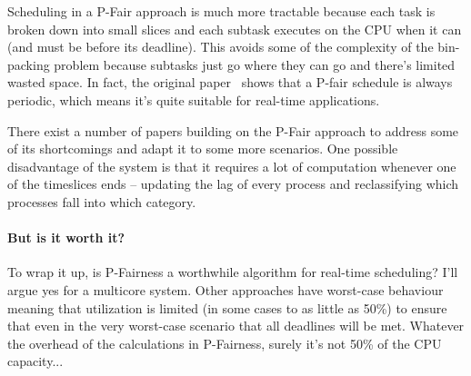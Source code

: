 Scheduling in a P-Fair approach is much more tractable because each task is broken down into small slices and each subtask executes on the CPU when it can (and must be before its deadline). This avoids some of the complexity of the bin-packing problem because subtasks just go where they can go and there's limited wasted space. In fact, the original paper~\cite{pfair} shows that a P-fair schedule is always periodic, which means it's quite suitable for real-time applications.

There exist a number of papers building on the P-Fair approach to address some of its shortcomings and adapt it to some more scenarios. One possible disadvantage of the system is that it requires a lot of computation whenever one of the timeslices ends -- updating the lag of every process and reclassifying which processes fall into which category. 

\paragraph{But is it worth it?}
To wrap it up, is P-Fairness a worthwhile algorithm for real-time scheduling? I'll argue yes for a multicore system. Other approaches have worst-case behaviour meaning that utilization is limited (in some cases to as little as 50\%) to ensure that even in the very worst-case scenario that all deadlines will be met. Whatever the overhead of the calculations in P-Fairness, surely it's not 50\% of the CPU capacity...



